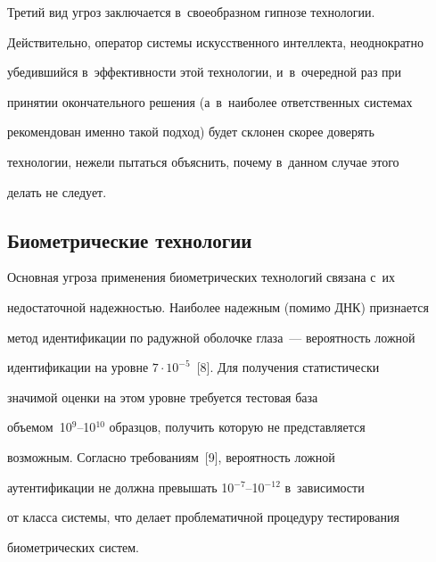    


   Третий вид угроз заключается в~своеобразном гипнозе технологии. 


Действительно, оператор системы искусственного интеллекта, неоднократно 


убедившийся в~эффективности этой технологии, и~в~очередной раз при 


принятии окончательного решения (а~в~наиболее ответственных системах 


рекомендован именно такой подход) будет склонен скорее доверять 


технологии, нежели пытаться объяснить, почему в~данном случае этого 


делать не следует.





\vspace*{-4pt}


   


     \subsection{Биометрические технологии }


     


     \vspace*{-2pt}


     


     Основная угроза применения биометрических технологий связана с~их 


недостаточной надежностью. Наиболее надежным (помимо ДНК) признается 


метод идентификации по радужной оболочке глаза~--- вероятность ложной 


идентификации на уровне $7\cdot 10^{-5}$~[8]. Для получения статистически 


значимой оценки на этом уровне требуется тестовая база 


 объемом~10$^9$--10$^{10}$ образцов, получить которую не представляется 


возможным. Согласно требованиям~[9], вероятность ложной 


аутентификации не должна превышать 10$^{-7}$--10$^{-12}$ в~зависимости 


от класса системы, что делает проблематичной процедуру тестирования 


биометрических систем. 


